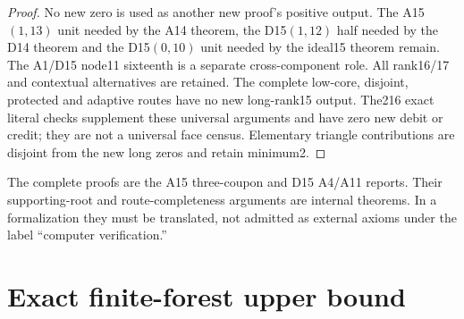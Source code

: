\documentclass[11pt]{article}
\theoremstyle{remark}\newtheorem{remark}[theorem]{Remark}
\begin{document}
\begin{proof}
No new zero is used as another new proof's positive output. The
A15$(1,13)$ unit needed by the A14 theorem, the D15$(1,12)$ half needed
by the D14 theorem and the D15$(0,10)$ unit needed by the ideal15
theorem remain. The A1/D15 node11 sixteenth is a separate cross-component
role. All rank16/17 and contextual alternatives are retained. The
complete low-core, disjoint, protected and adaptive routes have no new
long-rank15 output. The216 exact literal checks supplement these
universal arguments and have zero new debit or credit; they are not
a universal face census. Elementary triangle contributions are disjoint
from the new long zeros and retain minimum2.
\end{proof}

The complete proofs are the A15 three-coupon and D15 A4/A11 reports.
Their supporting-root and route-completeness arguments are internal
theorems. In a formalization they must be translated, not admitted as
external axioms under the label ``computer verification.''

\section{Exact finite-forest upper bound}
\end{document}
